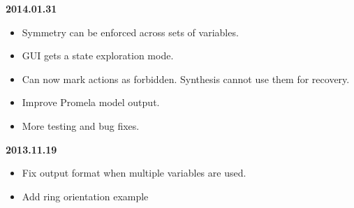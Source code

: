 \textbf{2014.01.31}
\begin{itemize}
\item Symmetry can be enforced across sets of variables.
\item GUI gets a state exploration mode.
\item Can now mark actions as forbidden. Synthesis cannot use them for recovery.
\item Improve Promela model output.
\item More testing and bug fixes.
\end{itemize}
\textbf{2013.11.19}
\begin{itemize}
\item Fix output format when multiple variables are used.
\item Add ring orientation example
\end{itemize}

